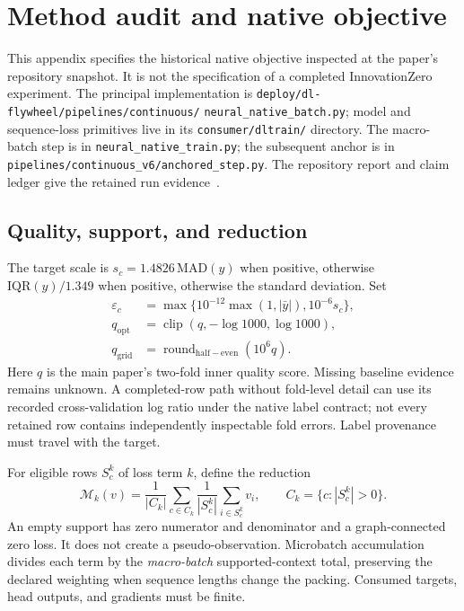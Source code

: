 \section{Method audit and native objective}
\label{sup:methods}

This appendix specifies the historical native objective inspected at the paper's
repository snapshot. It is not the specification of a completed InnovationZero
experiment. The principal implementation is
\texttt{deploy/dl-flywheel/pipelines/continuous/}\allowbreak
\texttt{neural\_native\_batch.py}; model and sequence-loss primitives live in its
\texttt{consumer/dltrain/} directory. The macro-batch step is in
\texttt{neural\_native\_train.py}; the subsequent anchor is in
\texttt{pipelines/continuous\_v6/anchored\_step.py}. The repository report and
claim ledger give the retained run evidence~\citep{jopedime2026writeup,jopedime2026repo}.

\subsection{Quality, support, and reduction}

The target scale is $s_c=1.4826\,\mathrm{MAD}(y)$ when positive, otherwise
$\mathrm{IQR}(y)/1.349$ when positive, otherwise the standard
deviation. Set
\begin{align}
 \varepsilon_c&=\max\{10^{-12}\max(1,|\bar y|),10^{-6}s_c\},\nonumber\\
 q_{\mathrm{opt}}&=\operatorname{clip}(q,-\log1000,\log1000),\nonumber\\
 q_{\mathrm{grid}}&=\operatorname{round}_{\mathrm{half-even}}(10^6q).
\end{align}
Here $q$ is the main paper's two-fold inner quality score. Missing baseline evidence remains
unknown. A completed-row path without fold-level detail can use its recorded
cross-validation log ratio under the native label contract; not every retained
row contains independently inspectable fold errors. Label provenance must travel
with the target.

For eligible rows $S_c^k$ of loss term $k$, define the reduction
\begin{equation}
 \mathcal{M}_k(v)=\frac{1}{|C_k|}\sum_{c\in C_k}
 \frac{1}{|S_c^k|}\sum_{i\in S_c^k}v_i,
 \qquad C_k=\{c:|S_c^k|>0\}.
\end{equation}
An empty support has zero numerator and denominator and a graph-connected zero
loss. It does not create a pseudo-observation. Microbatch accumulation divides
each term by the \emph{macro-batch} supported-context total, preserving the
declared weighting when sequence lengths change the packing. Consumed targets,
head outputs, and gradients must be finite.

